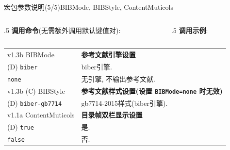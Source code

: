 \begin{frame}{ 宏包参数说明(5/5)}{BIBMode, BIBStyle, ContentMuticols}
	\vspace*{-1.2ex}
	\begin{columns}[T, onlytextwidth]%
		\begin{column}{.5\textwidth}
			\textbf{调用命令}(无需额外调用默认键值对):\\
		\end{column}
		\begin{column}{.5\textwidth}
			\textbf{调用示例}:\\
		\end{column}
	\end{columns}

	\begin{table}[h]
		\centering
		\begin{tabular}{>{\raggedleft\arraybackslash}p{}p{}}
			v1.3b \alert{\ttfamily BIBMode} & \textbf{参考文献引擎设置}\\
			(D) \texttt{biber} & biber引擎.\\
			\texttt{none} & 无引擎, 不输出参考文献.\\
			\midrule

			v1.3b (C) \alert{\ttfamily BIBStyle} & \textbf{参考文献样式设置(设置 \texttt{\alert{BIBMode}=none} 时无效)}\\
			(D) \texttt{biber-gb7714} & gb7714-2015样式(biber引擎).\\
			\midrule

			v1.1a \alert{\ttfamily ContentMuticols} & \textbf{目录帧双栏显示设置}\\
			(D) \texttt{true} & 是.\\
			\texttt{false} & 否.\\
		\end{tabular}
	\end{table}
	\vspace*{-2ex}
\end{frame}

